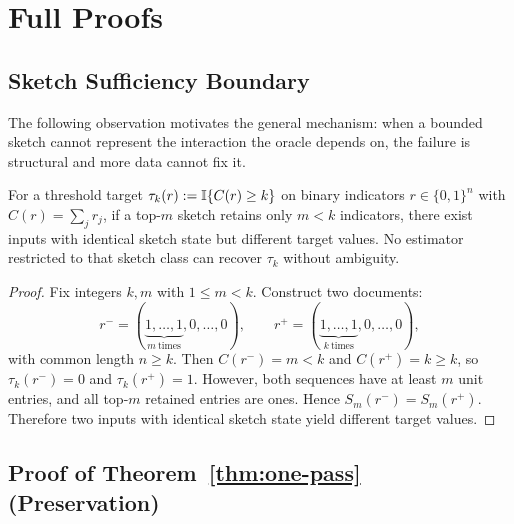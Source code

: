 \section{Full Proofs}\label{app:proofs}

\subsection{Sketch Sufficiency Boundary}\label{app:proof-m-lt-k}

The following observation motivates the general mechanism: when a bounded sketch cannot represent the interaction the oracle depends on, the failure is structural and more data cannot fix it.

\begin{proposition}\label{prop:m_lt_k}
For a threshold target $\tau_k(r) := \mathbb{I}\{C(r) \ge k\}$ on binary indicators $r \in \{0,1\}^n$ with $C(r) = \sum_j r_j$, if a top-$m$ sketch retains only $m < k$ indicators, there exist inputs with identical sketch state but different target values. No estimator restricted to that sketch class can recover $\tau_k$ without ambiguity.
\end{proposition}

\begin{proof}
Fix integers $k,m$ with $1 \le m < k$.
Construct two documents:
\[
r^{-} = (\underbrace{1,\dots,1}_{m\ \text{times}}, 0, \dots, 0), \qquad
r^{+} = (\underbrace{1,\dots,1}_{k\ \text{times}}, 0, \dots, 0),
\]
with common length $n \ge k$. Then $C(r^-) = m < k$ and $C(r^+) = k \ge k$, so
$\tau_k(r^-) = 0$ and $\tau_k(r^+) = 1$.
However, both sequences have at least $m$ unit entries, and all top-$m$ retained entries are ones.
Hence $S_m(r^-) = S_m(r^+)$.
Therefore two inputs with identical sketch state yield different target values.
\end{proof}

\subsection{Proof of Theorem~\ref{thm:one-pass} (Preservation)}\label{app:proof-preservation}

